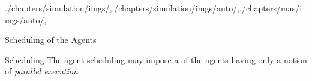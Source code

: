\begin{graphicspathcontext}{{./chapters/simulation/imgs/},{./chapters/simulation/imgs/auto/},{./chapters/mas/imgs/auto/},\old}

\begin{frame}{Scheduling of the Agents}
	\begin{definitionblock}{Scheduling}
		The agent scheduling may impose a  of the agents having only a notion of \emph{parallel execution}
	\end{definitionblock}
	\vspace{.5cm}
	\vspace{.5cm}
	\hfill
	\hfill
\end{frame}



\end{graphicspathcontext}
